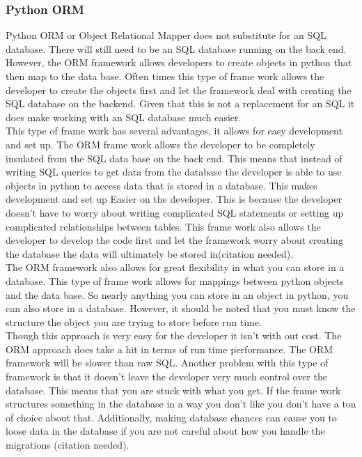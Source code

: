 \documentclass[letterpaper,10pt]{article}
\begin{document}
		\subsubsection{Python ORM}
				Python ORM or Object Relational Mapper does not substitute for an SQL database. There will still need to be an SQL database running on the back end. However, the ORM framework allows developers to create objects in python that then map to the data base. Often times this type of frame work allows the developer to create the objects first and let the framework deal with creating the SQL database on the backend. Given that this is not a replacement for an SQL it does make working with an SQL database much easier.\\
				This type of frame work has several advantages, it allows for easy development and set up. The ORM frame work allows the developer to be completely insulated from the SQL data base on the back end. This means that instead of writing SQL queries to get data from the database the developer is able to use objects in python to access data that is stored in a database. This makes development and set up Easier on the developer. This is because the developer doesn't have to worry about writing complicated SQL statements or setting up complicated relationships between tables. This frame work also allows the developer to develop the code first and let the framework worry about creating the database the data will ultimately be stored in(citation needed).\\
				The ORM framework also allows for great flexibility in what you can store in a database. This type of frame work allows for mappings between python objects and the data base. So nearly anything you can store in an object in python, you can also store in a database. However, it should be noted that you must know the structure the object you are trying to store before run time.\\
				Though this approach is very easy for the developer it isn't with out cost. The ORM approach does take a hit in terms of run time performance. The ORM framework will be slower than raw SQL. Another problem with this type of framework is that it doesn’t leave the developer very much control over the database. This means that you are stuck with what you get. If the frame work structures something in the database in a way you don't like you don't have a ton of choice about that. Additionally, making database chances can cause you to loose data in the database if you are not careful about how you handle the migrations (citation needed).\\
				
\end{document}
